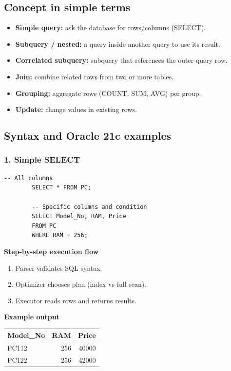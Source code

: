 \documentclass[11pt,a4paper]{article}
\begin{document}
	\subsection{Concept in simple terms}
	\begin{itemize}[noitemsep]
		\item \textbf{Simple query:} ask the database for rows/columns (SELECT).  
		\item \textbf{Subquery / nested:} a query inside another query to use its result.  
		\item \textbf{Correlated subquery:} subquery that references the outer query row.  
		\item \textbf{Join:} combine related rows from two or more tables.  
		\item \textbf{Grouping:} aggregate rows (COUNT, SUM, AVG) per group.  
		\item \textbf{Update:} change values in existing rows.
	\end{itemize}
	
	\subsection{Syntax and Oracle 21c examples}
	
	\subsubsection*{1. Simple SELECT}
	\begin{lstlisting}[caption={Select all PCs or specific columns}]
		-- All columns
		SELECT * FROM PC;
		
		-- Specific columns and condition
		SELECT Model_No, RAM, Price 
		FROM PC 
		WHERE RAM = 256;
	\end{lstlisting}
	
	\textbf{Step-by-step execution flow}
	\begin{enumerate}[noitemsep]
		\item Parser validates SQL syntax.  
		\item Optimizer chooses plan (index vs full scan).  
		\item Executor reads rows and returns results.  
	\end{enumerate}
	
	\textbf{Example output}
	\begin{center}
		\begin{tabular}{lrr}
			\toprule
			Model\_No & RAM & Price \\
			\midrule
			PC112 & 256 & 40000 \\
			PC122 & 256 & 42000 \\
			\bottomrule
		\end{tabular}
	\end{center}
	
\end{document}
